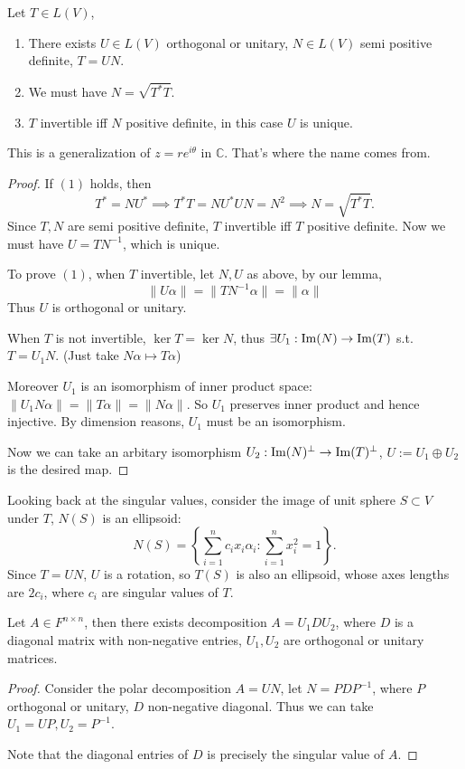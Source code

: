 \begin{theorem}
    Let $T\in L(V)$,
	\begin{enumerate}[\indent(1)]
		\item There exists $U\in L(V)$ orthogonal or unitary,
			$N\in L(V)$ semi positive definite, $T = UN$.
		\item We must have $N = \sqrt{T^*T}$.
		\item $T$ invertible iff $N$ positive definite, in this case $U$ is unique.
	\end{enumerate}
\end{theorem}
\begin{remark}
    This is a generalization of $z = re^{i\theta}$ in $\mathbb{C}$.
	That's where the name comes from.
\end{remark}
\begin{proof}[Proof]
    If $(1)$ holds, then
	\[
	T^* = NU^* \implies T^*T = NU^*UN = N^2 \implies N = \sqrt{T^*T}.
	\]
	Since $T, N$ are semi positive definite, $T$ invertible iff $T$ positive definite.
	Now we must have $U = TN^{-1}$, which is unique.

	To prove $(1)$, when $T$ invertible, let $N, U$ as above,
	by our lemma,
	\[
		\lVert U\alpha \rVert = \lVert TN^{-1}\alpha \rVert = \lVert \alpha \rVert
	\]
	Thus $U$ is orthogonal or unitary.

	When $T$ is not invertible, $\ker T = \ker N$,
	thus $\exists U_1: \operatorname{Im}(N) \to \operatorname{Im}(T)$ s.t. $T = U_1N$.
	(Just take $N\alpha\mapsto T\alpha$)

	Moreover $U_1$ is an isomorphism of inner product space:
	$\lVert U_1N\alpha \rVert = \lVert T\alpha \rVert = \lVert N\alpha \rVert$.
	So $U_1$ preserves inner product and hence injective.
	By dimension reasons, $U_1$ must be an isomorphism.

	Now we can take an arbitary isomorphism $U_2: \operatorname{Im}(N)^\perp\to \operatorname{Im}(T)^\perp$,
	$U := U_1\oplus U_2$ is the desired map.
\end{proof}

Looking back at the singular values,
consider the image of unit sphere $S \subset V$ under $T$,
$N(S)$ is an ellipsoid:
\[
N(S) = \left\{\sum_{i=1}^{n} c_ix_i\alpha_i: \sum_{i=1}^{n} x_i^2 = 1\right\}.
\]
Since $T = UN$, $U$ is a rotation, so $T(S)$ is also an ellipsoid,
whose axes lengths are $2c_i$, where $c_i$ are singular values of $T$.

\begin{corollary}
    Let $A \in F^{n\times n}$, then there exists decomposition $A = U_1DU_2$,
	where $D$ is a diagonal matrix with non-negative entries,
	$U_1, U_2$ are orthogonal or unitary matrices.
\end{corollary}
\begin{proof}[Proof]
    Consider the polar decomposition $A = UN$, let  $N = PDP^{-1}$,
	where $P$ orthogonal or unitary, $D$ non-negative diagonal.
	Thus we can take $U_1 = UP, U_2 = P^{-1}$.

	Note that the diagonal entries of $D$ is precisely the singular value of $A$.
\end{proof}

